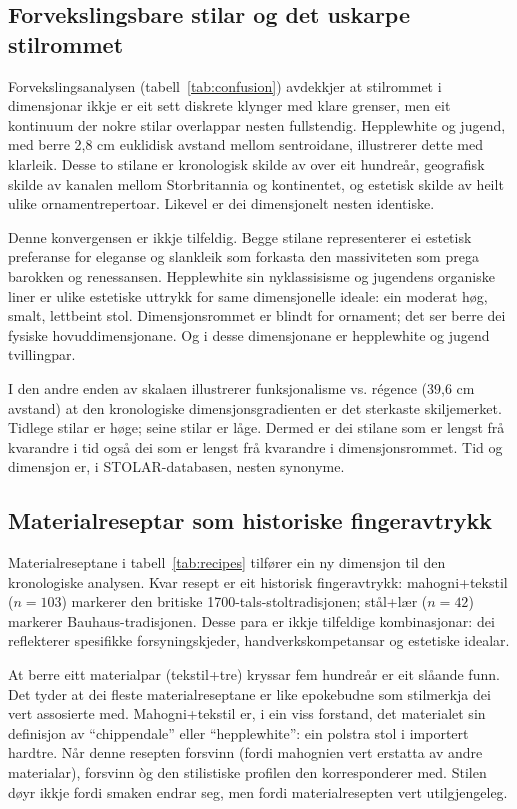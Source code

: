 \documentclass[10pt, a4paper, twocolumn]{article}
\begin{document}
\subsection{Forvekslingsbare stilar og det uskarpe stilrommet}

Forvekslingsanalysen (tabell~\ref{tab:confusion}) avdekkjer at stilrommet i dimensjonar ikkje er eit sett diskrete klynger med klare grenser, men eit kontinuum der nokre stilar overlappar nesten fullstendig. Hepplewhite og jugend, med berre 2,8 cm euklidisk avstand mellom sentroidane, illustrerer dette med klarleik. Desse to stilane er kronologisk skilde av over eit hundreår, geografisk skilde av kanalen mellom Storbritannia og kontinentet, og estetisk skilde av heilt ulike ornamentrepertoar. Likevel er dei dimensjonelt nesten identiske.

Denne konvergensen er ikkje tilfeldig. Begge stilane representerer ei estetisk preferanse for eleganse og slankleik som forkasta den massiviteten som prega barokken og renessansen. Hepplewhite sin nyklassisisme og jugendens organiske liner er ulike estetiske uttrykk for same dimensjonelle ideale: ein moderat høg, smalt, lettbeint stol. Dimensjonsrommet er blindt for ornament; det ser berre dei fysiske hovuddimensjonane. Og i desse dimensjonane er hepplewhite og jugend tvillingpar.

I den andre enden av skalaen illustrerer funksjonalisme vs. régence (39,6 cm avstand) at den kronologiske dimensjonsgradienten er det sterkaste skiljemerket. Tidlege stilar er høge; seine stilar er låge. Dermed er dei stilane som er lengst frå kvarandre i tid også dei som er lengst frå kvarandre i dimensjonsrommet. Tid og dimensjon er, i STOLAR-databasen, nesten synonyme.


\subsection{Materialreseptar som historiske fingeravtrykk}

Materialreseptane i tabell~\ref{tab:recipes} tilfører ein ny dimensjon til den kronologiske analysen. Kvar resept er eit historisk fingeravtrykk: mahogni+tekstil ($n = 103$) markerer den britiske 1700-tals-stoltradisjonen; stål+lær ($n = 42$) markerer Bauhaus-tradisjonen. Desse para er ikkje tilfeldige kombinasjonar: dei reflekterer spesifikke forsyningskjeder, handverkskompetansar og estetiske idealar.

At berre eitt materialpar (tekstil+tre) kryssar fem hundreår er eit slåande funn. Det tyder at dei fleste materialreseptane er like epokebudne som stilmerkja dei vert assosierte med. Mahogni+tekstil er, i ein viss forstand, det materialet sin definisjon av ``chippendale'' eller ``hepplewhite'': ein polstra stol i importert hardtre. Når denne resepten forsvinn (fordi mahognien vert erstatta av andre materialar), forsvinn òg den stilistiske profilen den korresponderer med. Stilen døyr ikkje fordi smaken endrar seg, men fordi materialresepten vert utilgjengeleg.
\end{document}
